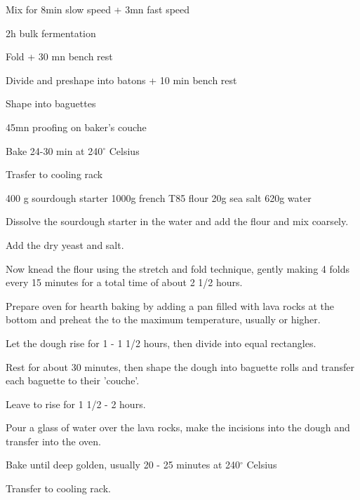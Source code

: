 \begin{method}		
 	Mix for 8min slow speed + 3mn fast speed
 	
 	2h bulk fermentation
 	
 	Fold + 30 mn bench rest
 	
 	Divide and preshape into batons + 10 min bench rest
 	
 	Shape into baguettes
 	
 	45mn proofing on baker's couche
 	
 	Bake 24-30 min at 240$^{\circ}$ Celsius
 	
 	Trasfer to cooling rack

\end {method}

\label{rec:bread-campagne}

\begin{ingreds}
	400 g sourdough starter
	1000g french T85 flour
	20g sea salt
	620g water
\end{ingreds}

\begin{method}		
     	Dissolve the sourdough starter in the water and add the flour and mix coarsely.

	Add the dry yeast and salt.

	Now knead the flour using the stretch and fold technique, gently making 4 folds  every 15 minutes for a total time of about 2 1/2 hours.

	Prepare oven for hearth baking by adding a pan filled with lava rocks at the bottom and preheat the to the maximum temperature, usually  or higher.

	Let the dough rise for 1 - 1 1/2 hours, then divide into equal rectangles.

	Rest for about 30 minutes, then shape the dough into baguette rolls and transfer each baguette to their 'couche'.

	Leave to rise for 1 1/2 - 2 hours.

	Pour a glass of water over the lava rocks, make the incisions into the dough and transfer into the oven.

	Bake until deep golden,  usually 20 - 25 minutes at 240$^{\circ}$ Celsius

	Transfer to cooling rack.

\end {method}

